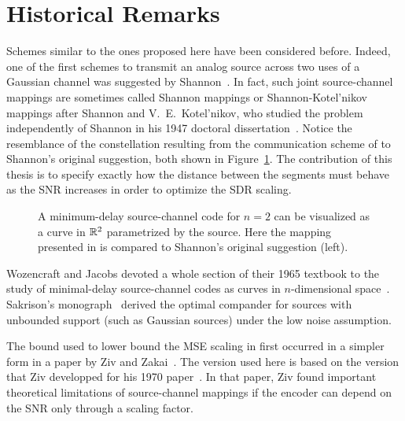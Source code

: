 
\section{Historical Remarks}\label{sec:mindelbwexhist}

Schemes similar to the ones proposed here have been considered before. Indeed,
one of the first schemes to transmit an analog source across two uses of a
Gaussian channel was suggested by Shannon~\cite{Shannon1949}. In fact, such
joint source-channel mappings are sometimes called Shannon mappings  or
Shannon-Kotel'nikov mappings after Shannon and V.~E.~Kotel'nikov, who studied
the problem independently of Shannon in his 1947 doctoral
dissertation~\cite{Kotelnikov1960}.  Notice the resemblance of the
constellation resulting from the communication scheme of  to
Shannon's original suggestion,
both shown in Figure~\ref{fig:shannoncomparison}. The contribution of this
thesis is to specify exactly how the distance between the segments must behave
as the SNR increases in order to optimize the SDR scaling.

\begin{figure}
  \centerline{
  \hfil
  \subfloat[Mapping proposed in \secref{scalarquant}
  (for~$n=2$).]{} }%
  \caption{A minimum-delay source-channel code for $n=2$ can be visualized as a
  curve in $\mathbb{R}^2$ parametrized by the source. Here the mapping
  presented in  is compared to Shannon's original
  suggestion (left).} \label{fig:shannoncomparison}
\end{figure}

Wozencraft and Jacobs devoted a whole section of their 1965 textbook to
the study of minimal-delay source-channel codes as curves in $n$-dimensional
space~\cite[Section~8.2]{WozencraftJ1965}. Sakrison's
monograph~\cite{Sakrison1970} derived the optimal compander for sources with
unbounded support (such as Gaussian sources) under the low noise assumption. 

The bound used to lower bound the MSE scaling in  first
occurred in a simpler form in a paper by Ziv and Zakai~\cite{ZivZ1969}. The
version used here is based on the version that Ziv developped for his 1970
paper~\cite{Ziv1970}. In that paper, Ziv found important
theoretical limitations of source-channel mappings if the encoder can depend
on the SNR only through a scaling factor.

